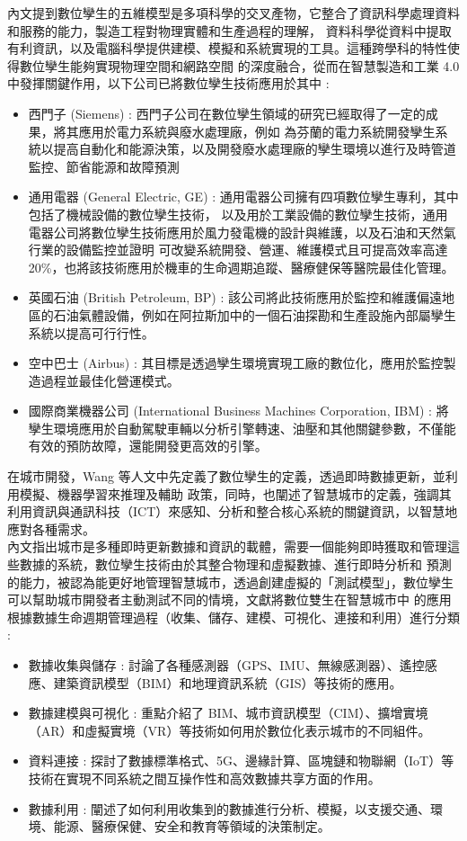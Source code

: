 內文提到數位孿生的五維模型是多項科學的交叉產物，它整合了資訊科學處理資料和服務的能力，製造工程對物理實體和生產過程的理解，
資料科學從資料中提取有利資訊，以及電腦科學提供建模、模擬和系統實現的工具。這種跨學科的特性使得數位孿生能夠實現物理空間和網路空間
的深度融合，從而在智慧製造和工業 4.0 中發揮關鍵作用，以下公司已將數位孿生技術應用於其中 : \\
\begin{itemize}
      \item 西門子 (Siemens) :
            西門子公司在數位孿生領域的研究已經取得了一定的成果，將其應用於電力系統與廢水處理廠，例如
            為芬蘭的電力系統開發孿生系統以提高自動化和能源決策，以及開發廢水處理廠的孿生環境以進行及時管道監控、節省能源和故障預測
      \item 通用電器 (General Electric, GE) :
            通用電器公司擁有四項數位孿生專利，其中包括了機械設備的數位孿生技術，
            以及用於工業設備的數位孿生技術，通用電器公司將數位孿生技術應用於風力發電機的設計與維護，以及石油和天然氣行業的設備監控並證明
            可改變系統開發、營運、維護模式且可提高效率高達 20\%，也將該技術應用於機車的生命週期追蹤、醫療健保等醫院最佳化管理。
      \item 英國石油 (British Petroleum, BP) :
            該公司將此技術應用於監控和維護偏遠地區的石油氣體設備，例如在阿拉斯加中的一個石油探勘和生產設施內部屬孿生系統以提高可行行性。
      \item 空中巴士 (Airbus) :
            其目標是透過孿生環境實現工廠的數位化，應用於監控製造過程並最佳化營運模式。
      \item 國際商業機器公司 (International Business Machines Corporation, IBM) :
            將孿生環境應用於自動駕駛車輛以分析引擎轉速、油壓和其他關鍵參數，不僅能有效的預防故障，還能開發更高效的引擎。
\end{itemize}
在城市開發，Wang 等人\cite{Glaessgen2012DigitalTwin}文中先定義了數位孿生的定義，透過即時數據更新，並利用模擬、機器學習來推理及輔助
政策，同時，也闡述了智慧城市的定義，強調其利用資訊與通訊科技（ICT）來感知、分析和整合核心系統的關鍵資訊，以智慧地應對各種需求。\\
內文指出城市是多種即時更新數據和資訊的載體，需要一個能夠即時獲取和管理這些數據的系統，數位孿生技術由於其整合物理和虛擬數據、進行即時分析和
預測的能力，被認為能更好地管理智慧城市，透過創建虛擬的「測試模型」，數位孿生可以幫助城市開發者主動測試不同的情境，文獻將數位雙生在智慧城市中
的應用根據數據生命週期管理過程（收集、儲存、建模、可視化、連接和利用）進行分類 :
\begin{itemize}
      \item 數據收集與儲存 :
            討論了各種感測器（GPS、IMU、無線感測器）、遙控感應、建築資訊模型（BIM）和地理資訊系統（GIS）等技術的應用。
      \item 數據建模與可視化 :
            重點介紹了 BIM、城市資訊模型（CIM）、擴增實境（AR）和虛擬實境（VR）等技術如何用於數位化表示城市的不同組件。
      \item 資料連接 :
            探討了數據標準格式、5G、邊緣計算、區塊鏈和物聯網（IoT）等技術在實現不同系統之間互操作性和高效數據共享方面的作用。
      \item 數據利用 :
            闡述了如何利用收集到的數據進行分析、模擬，以支援交通、環境、能源、醫療保健、安全和教育等領域的決策制定。
\end{itemize}
